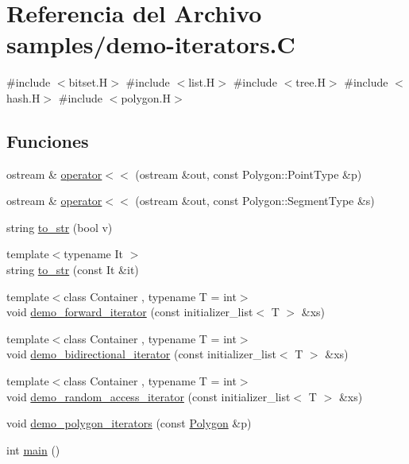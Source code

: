 \hypertarget{demo-iterators_8_c}{}\section{Referencia del Archivo samples/demo-\/iterators.C}
\label{demo-iterators_8_c}
{\ttfamily \#include $<$bitset.\+H$>$}\newline
{\ttfamily \#include $<$list.\+H$>$}\newline
{\ttfamily \#include $<$tree.\+H$>$}\newline
{\ttfamily \#include $<$hash.\+H$>$}\newline
{\ttfamily \#include $<$polygon.\+H$>$}\newline
\subsection*{Funciones}
\begin{DoxyCompactItemize}
\item 
ostream \& \hyperlink{demo-iterators_8_c_a923e96e2eb2a21cf7d668e804417c47a}{operator$<$$<$} (ostream \&out, const Polygon\+::\+Point\+Type \&p)
\item 
ostream \& \hyperlink{demo-iterators_8_c_aeeb3d06d99a03eacdce5a549712941cb}{operator$<$$<$} (ostream \&out, const Polygon\+::\+Segment\+Type \&s)
\item 
string \hyperlink{demo-iterators_8_c_af423c937ed0522544ed90c34b85d897e}{to\+\_\+str} (bool v)
\item 
{\footnotesize template$<$typename It $>$ }\\string \hyperlink{demo-iterators_8_c_af8bbc1c2b472077a39826f8635457c12}{to\+\_\+str} (const It \&it)
\item 
{\footnotesize template$<$class Container , typename T  = int$>$ }\\void \hyperlink{demo-iterators_8_c_a971180b8ea13c61009c451fe7a942839}{demo\+\_\+forward\+\_\+iterator} (const initializer\+\_\+list$<$ T $>$ \&xs)
\item 
{\footnotesize template$<$class Container , typename T  = int$>$ }\\void \hyperlink{demo-iterators_8_c_a26a099cedf4512aa8f05c2dd18e4b3d2}{demo\+\_\+bidirectional\+\_\+iterator} (const initializer\+\_\+list$<$ T $>$ \&xs)
\item 
{\footnotesize template$<$class Container , typename T  = int$>$ }\\void \hyperlink{demo-iterators_8_c_ad21d9d25e5563ab0ee7ebd1a3092b1df}{demo\+\_\+random\+\_\+access\+\_\+iterator} (const initializer\+\_\+list$<$ T $>$ \&xs)
\item 
void \hyperlink{demo-iterators_8_c_a17b3db72ea3737c300ed830ce644aba8}{demo\+\_\+polygon\+\_\+iterators} (const \hyperlink{class_designar_1_1_polygon}{Polygon} \&p)
\item 
int \hyperlink{demo-iterators_8_c_ae66f6b31b5ad750f1fe042a706a4e3d4}{main} ()
\end{DoxyCompactItemize}


